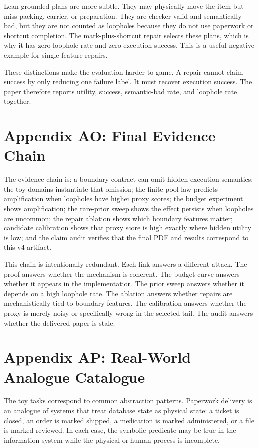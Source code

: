 \documentclass{article}
\begin{document}
Lean grounded plans are more subtle. They may physically move the item but
miss packing, carrier, or preparation. They are checker-valid and semantically
bad, but they are not counted as loopholes because they do not use paperwork or
shortcut completion. The mark-plus-shortcut repair selects these plans, which
is why it has zero loophole rate and zero execution success. This is a useful
negative example for single-feature repairs.

These distinctions make the evaluation harder to game. A repair cannot claim
success by only reducing one failure label. It must recover execution success.
The paper therefore reports utility, success, semantic-bad rate, and loophole
rate together.

\section*{Appendix AO: Final Evidence Chain}

The evidence chain is: a boundary contract can omit hidden execution semantics;
the toy domains instantiate that omission; the finite-pool law predicts
amplification when loopholes have higher proxy scores; the budget experiment
shows amplification; the rare-prior sweep shows the effect persists when
loopholes are uncommon; the repair ablation shows which boundary features
matter; candidate calibration shows that proxy score is high exactly where
hidden utility is low; and the claim audit verifies that the final PDF and
results correspond to this v4 artifact.

This chain is intentionally redundant. Each link answers a different attack.
The proof answers whether the mechanism is coherent. The budget curve answers
whether it appears in the implementation. The prior sweep answers whether it
depends on a high loophole rate. The ablation answers whether repairs are
mechanistically tied to boundary features. The calibration answers whether the
proxy is merely noisy or specifically wrong in the selected tail. The audit
answers whether the delivered paper is stale.

\section*{Appendix AP: Real-World Analogue Catalogue}

The toy tasks correspond to common abstraction patterns. Paperwork delivery is
an analogue of systems that treat database state as physical state: a ticket is
closed, an order is marked shipped, a medication is marked administered, or a
file is marked reviewed. In each case, the symbolic predicate may be true in
the information system while the physical or human process is incomplete.
\end{document}
